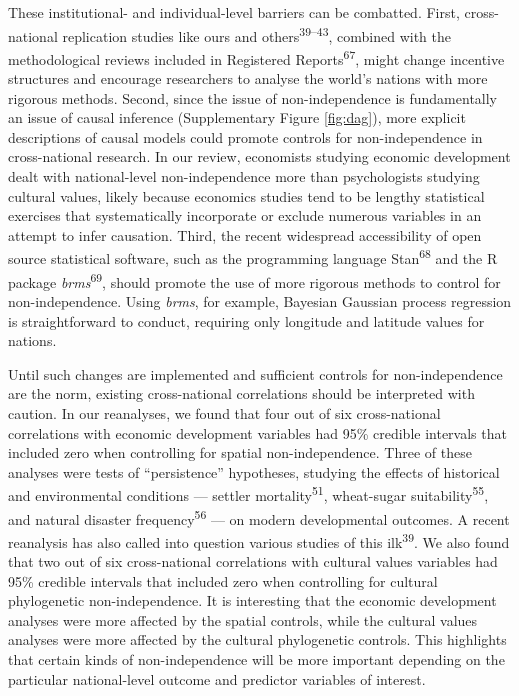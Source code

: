 \documentclass[english,man,floatsintext]{apa6}
\begin{document}
These institutional- and individual-level barriers can be combatted. First, cross-national replication studies like ours and others\textsuperscript{39--43}, combined with the methodological reviews included in Registered Reports\textsuperscript{67}, might change incentive structures and encourage researchers to analyse the world's nations with more rigorous methods. Second, since the issue of non-independence is fundamentally an issue of causal inference (Supplementary Figure \ref{fig:dag}), more explicit descriptions of causal models could promote controls for non-independence in cross-national research. In our review, economists studying economic development dealt with national-level non-independence more than psychologists studying cultural values, likely because economics studies tend to be lengthy statistical exercises that systematically incorporate or exclude numerous variables in an attempt to infer causation. Third, the recent widespread accessibility of open source statistical software, such as the programming language Stan\textsuperscript{68} and the R package \emph{brms}\textsuperscript{69}, should promote the use of more rigorous methods to control for non-independence. Using \emph{brms}, for example, Bayesian Gaussian process regression is straightforward to conduct, requiring only longitude and latitude values for nations.

Until such changes are implemented and sufficient controls for non-independence are the norm, existing cross-national correlations should be interpreted with caution. In our reanalyses, we found that four out of six cross-national correlations with economic development variables had 95\% credible intervals that included zero when controlling for spatial non-independence. Three of these analyses were tests of \enquote{persistence} hypotheses, studying the effects of historical and environmental conditions --- settler mortality\textsuperscript{51}, wheat-sugar suitability\textsuperscript{55}, and natural disaster frequency\textsuperscript{56} --- on modern developmental outcomes. A recent reanalysis has also called into question various studies of this ilk\textsuperscript{39}. We also found that two out of six cross-national correlations with cultural values variables had 95\% credible intervals that included zero when controlling for cultural phylogenetic non-independence. It is interesting that the economic development analyses were more affected by the spatial controls, while the cultural values analyses were more affected by the cultural phylogenetic controls. This highlights that certain kinds of non-independence will be more important depending on the particular national-level outcome and predictor variables of interest.
\end{document}

